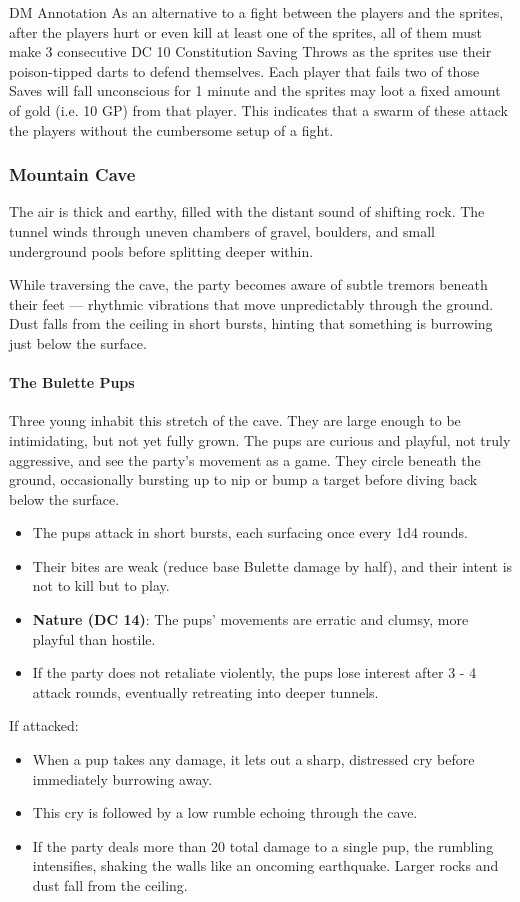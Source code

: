 \begingroup
	\DndSetThemeColor[PhbTan]
	\begin{DndComment}{DM Annotation}
		As an alternative to a fight between the players and the sprites, after the players hurt or even kill at least one of the sprites, all of them must make 3 consecutive DC 10 Constitution Saving Throws as the sprites use their poison-tipped darts to defend themselves. Each player that fails two of those Saves will fall unconscious for 1 minute and the sprites may loot a fixed amount of gold (i.e. 10 GP) from that player. This indicates that a swarm of these attack the players without the cumbersome setup of a fight.
	\end{DndComment}
\endgroup
\vfill\eject
\subsubsection*{Mountain Cave}\label{subsubsec:MountainCave}
{\entryfont The air is thick and earthy, filled with the distant sound of shifting rock. The tunnel winds through uneven chambers of gravel, boulders, and small underground pools before splitting deeper within.

While traversing the cave, the party becomes aware of subtle tremors beneath their feet — rhythmic vibrations that move unpredictably through the ground. Dust falls from the ceiling in short bursts, hinting that something is burrowing just below the surface.}
\paragraph*{The Bulette Pups} {\entryfont Three young \hyperref[monster:BulettePup]{} inhabit this stretch of the cave. They are large enough to be intimidating, but not yet fully grown. The pups are curious and playful, not truly aggressive, and see the party's movement as a game. They circle beneath the ground, occasionally bursting up to nip or bump a target before diving back below the surface.
\begin{itemize}
	\item The pups attack in short bursts, each surfacing once every 1d4 rounds.
	\item Their bites are weak (reduce base Bulette damage by half), and their intent is not to kill but to play.
	\item \textbf{Nature (DC 14)}: The pups' movements are erratic and clumsy, more playful than hostile.
	\item If the party does not retaliate violently, the pups lose interest after 3 - 4 attack rounds, eventually retreating into deeper tunnels.
\end{itemize}
If attacked:
\begin{itemize}
	\item When a pup takes any damage, it lets out a sharp, distressed cry before immediately burrowing away.
	\item This cry is followed by a low rumble echoing through the cave.
	\item If the party deals more than 20 total damage to a single pup, the rumbling intensifies, shaking the walls like an oncoming earthquake. Larger rocks and dust fall from the ceiling.
\end{itemize}}
